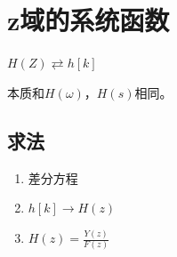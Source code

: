 \documentclass[UTF8]{ctexart}
\begin{document}
\section{z域的系统函数}
$H(Z)\rightleftarrows h[k]$ \par
本质和$H(\omega)$，$H(s)$相同。\par
\subsection{求法}
\begin{enumerate}[label=(\arabic*),itemindent=0pt,labelindent=\parindent,labelwidth=2em,labelsep=5pt,leftmargin=*]
  \item 差分方程
  \item $h[k]\rightarrow H(z)$
  \item $H(z)=\frac{Y(z)}{F(z)}$
\end{enumerate}\par
\end{document}
